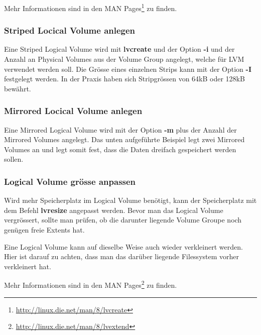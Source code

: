 Mehr Informationen sind in den MAN Pages\footnote{\href{http://linux.die.net/man/8/lvcreate}{http://linux.die.net/man/8/lvcreate}}  zu finden.

\subsubsection{Striped Locical Volume anlegen}

Eine Striped Logical Volume wird mit \textbf{lvcreate} und der Option \textbf{-i} und der Anzahl an Physical Volumes aus der Volume Group angelegt, welche für LVM verwendet werden soll. Die Grösse eines einzelnen Strips kann mit der Option \textbf{-I} festgelegt werden. In der Praxis haben sich Stripgrössen von 64kB oder 128kB bewährt.


\subsubsection{Mirrored Locical Volume anlegen}

Eine Mirrored Logical Volume wird mit der Option \textbf{-m} plus der Anzahl der Mirrored Volumes angelegt. Das unten aufgeführte Beispiel legt zwei Mirrored Volumes an und legt somit fest, dass die Daten dreifach gespeichert werden sollen.



\subsubsection{Logical Volume grösse anpassen}

Wird mehr Speicherplatz im Logical Volume benötigt, kann der Speicherplatz mit dem Befehl \textbf{lvresize} 
angepasst werden. Bevor man das Logical Volume vergrössert, sollte man prüfen, ob die darunter liegende Volume Groupe noch genügen freie Extents hat.


Eine Logical Volume kann auf dieselbe Weise auch wieder verkleinert werden. Hier ist darauf zu achten, dass man das darüber liegende Filessystem vorher verkleinert hat.


Mehr Informationen sind in den MAN Pages\footnote{\href{http://linux.die.net/man/8/lvextend}{http://linux.die.net/man/8/lvextend}} zu finden.

